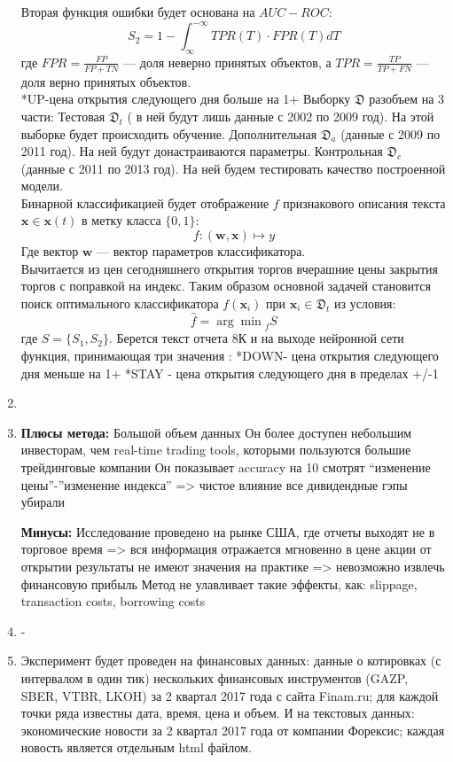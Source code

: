\documentclass[12pt, twoside]{article}
\begin{document}
\begin{enumerate}
Вторая функция ошибки будет основана на $AUC-ROC$: $$S_2 = 1 - \int_\infty^{-\infty} {TPR(T) \cdot FPR(T) dT}$$ где $FPR = \frac{FP}{FP + TN}$ --- доля неверно принятых объектов, а $TPR = \frac{TP}{TP + FN}$ --- доля верно принятых объектов.\\
*UP-цена открытия следующего дня больше на 1+%
Выборку $\mathfrak{D}$ разобъем на 3 части: Тестовая $\mathfrak{D}_t$ ( в ней будут лишь данные с 2002 по 2009 год). На этой выборке будет происходить обучение. Дополнительная $\mathfrak{D}_a$ (данные с 2009 по 2011 год). На ней будут донастраиваются параметры. Контрольная  $\mathfrak{D}_c$ (данные с 2011 по 2013 год). На ней будем тестировать качество построенной модели.\\
Бинарной классификацией будет отображение $f$ признакового описания текста $\mathbf{x} \in \mathbf{x}(t)$ в метку класса $\{0, 1\}$: $$f: (\mathbf{w, x}) \mapsto y$$ Где вектор $\mathbf{w}$ --- вектор параметров классификатора.\\
Вычитается из цен сегодняшнего открытия торгов вчерашние цены закрытия торгов с поправкой на индекс.
Таким образом основной задачей становится поиск оптимального классификатора $f(\mathbf{x}_i)$ при $\mathbf{x}_i \in \mathfrak{D}_t$ из условия: $$\hat{f} = {\arg\!\min}_{f} S$$
где $S = \{S_1, S_2\}$.
Берется текст отчета 8К и на выходе нейронной сети функция, принимающая три значения :
*DOWN- цена открытия следующего дня меньше на 1+%
*STAY - цена открытия следующего дня в пределах +/-1%

\item \href{https://drive.google.com/file/d/12KsFJNEADfXYLlV0Ler19A1E9N1pGa3-/view?usp=sharing}{\color{blue}{Работа, описывающая наиболее близкое решение}} 

\item \textbf{Плюсы метода:}
Большой объем данных
Он более доступен небольшим инвесторам, чем real-time trading tools, которыми пользуются большие трейдинговые компании
Он показывает accuracy на 10%
смотрят “изменение цены”-”изменение индекса” => чистое влияние
все дивидендные гэпы убирали 

\textbf{Минусы:}
Исследование проведено на рынке США, где отчеты выходят не в торговое время => вся информация отражается мгновенно в цене акции от открытии
результаты не имеют значения на практике => невозможно извлечь финансовую прибыль
Метод не улавливает такие эффекты, как: slippage, transaction costs, borrowing costs

\item -
\item Эксперимент будет проведен на финансовых данных: данные о котировках (с интервалом в один тик) нескольких финансовых инструментов (GAZP, SBER, VTBR, LKOH) за 2 квартал 2017 года с сайта Finam.ru; для каждой точки ряда известны дата, время, цена и объем. И на текстовых данных: экономические новости за 2 квартал 2017 года от компании Форексис; каждая новость является отдельным html файлом.
\end{enumerate}
\end{document}

